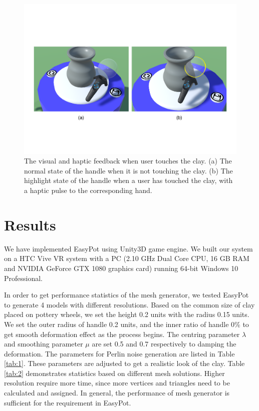 \documentclass{svjour3}                     %
\begin{document}
\begin{figure}
\includegraphics[width=\textwidth]{highlight}
\caption{The visual and haptic feedback when user touches the clay. (a) The normal state of the handle when it is not touching the clay. (b) The highlight state of the handle when a user has touched the clay, with a haptic pulse to the corresponding hand.}
\label{fig:highlight}
\end{figure}


\section{Results}
\label{sec:5}

We have implemented EasyPot using Unity3D \cite{website:unity} game engine. We built our system on a HTC Vive \cite{website:vive} VR system with a PC (2.10 GHz Dual Core CPU, 16 GB RAM and NVIDIA GeForce GTX 1080 graphics card) running 64-bit Windows 10 Professional.

In order to get performance statistics of the mesh generator, we tested EasyPot to generate 4 models with different resolutions.
Based on the common size of clay placed on pottery wheels, we set the height 0.2 units with the radius 0.15 units.
We set the outer radius of handle 0.2 units, and the inner ratio of handle 0\% to get smooth deformation effect as the process begins. The centring parameter $\lambda$ and smoothing parameter $\mu$ are set 0.5 and 0.7 respectively to damping the deformation. The parameters for Perlin noise generation are listed in Table \ref{tab:1}. These parameters are adjusted to get a realistic look of the clay.
Table \ref{tab:2} demonstrates statistics based on different mesh solutions. Higher resolution require more time, since more vertices and triangles need to be calculated and assigned. In general, the performance of mesh generator is sufficient for the requirement in EasyPot.
\end{document}
